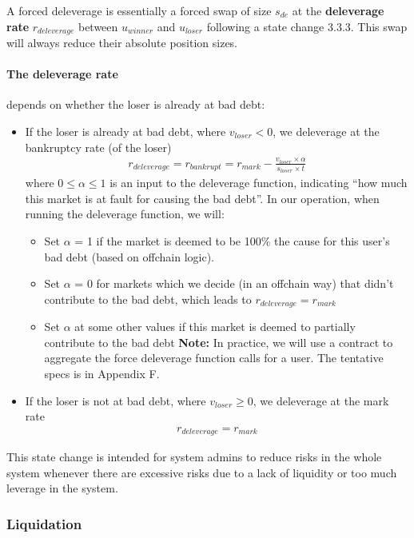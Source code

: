 \documentclass{article}%
\begin{document}
A forced deleverage is essentially a forced swap of size $s_{de}$ at the \textbf{deleverage rate} $r_{deleverage}$ between $u_{winner}$ and $u_{loser}$ following a state change 3.3.3. This swap will always reduce their absolute position sizes.

\paragraph{The deleverage rate} depends on whether the loser is already at bad debt:
\begin{itemize}
    \item If the loser is already at bad debt, where $v_{loser} < 0$, we deleverage at the bankruptcy rate (of the loser)
    \begin{align*}
        r_{deleverage} = r_{bankrupt} = r_{mark} - \frac{v_{loser} \times \alpha}{s_{loser}\times t}
    \end{align*}
    where $0 \leq \alpha \leq 1$ is an input to the deleverage function, indicating ``how much this market is at fault for causing the bad debt''. In our operation, when running the deleverage function, we will:
    \begin{itemize}
        \item Set $\alpha$ = 1 if the market is deemed to be 100\% the cause for this user's bad debt (based on offchain logic).
        \item Set $\alpha$ = 0 for markets which we decide (in an offchain way) that didn't contribute to the bad debt, which leads to $r_{deleverage}=r_{mark}$
        \item Set $\alpha$ at some other values if this market is deemed to partially contribute to the bad debt
    \textbf{Note:} In practice, we will use a contract to aggregate the force deleverage function calls for a user. The tentative specs is in Appendix F.
    \end{itemize}
    \item If the loser is not at bad debt, where $v_{loser} \geq 0$, we deleverage at the mark rate
    \begin{align*}
        r_{deleverage} = r_{mark}
    \end{align*}    
\end{itemize}


This state change is intended for system admins to reduce risks in the whole system whenever there are excessive risks due to a lack of liquidity or too much leverage in the system.
\subsubsection{Liquidation}
\end{document}

